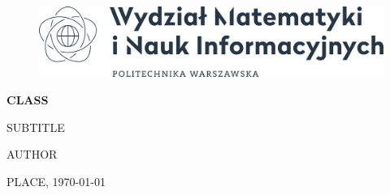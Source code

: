 \documentclass[a4paper,12pt]{article}
\begin{document}
\begin{titlepage}
    \begin{center}
        \begin{figure}[H]
            \centering
            \includegraphics[width=\textwidth]{mini.png}
        \end{figure}

        \vspace{1cm}
        \Huge \textsf{\textbf{CLASS}}

        \vspace{1cm}
        \LARGE \textsf{SUBTITLE}

        \vspace{1cm}
        \Large \textsf{AUTHOR}

        \vfill
        \Large \textsf{PLACE, \today}
    \end{center}
\end{titlepage}

\tableofcontents
\pagebreak
\end{document}
